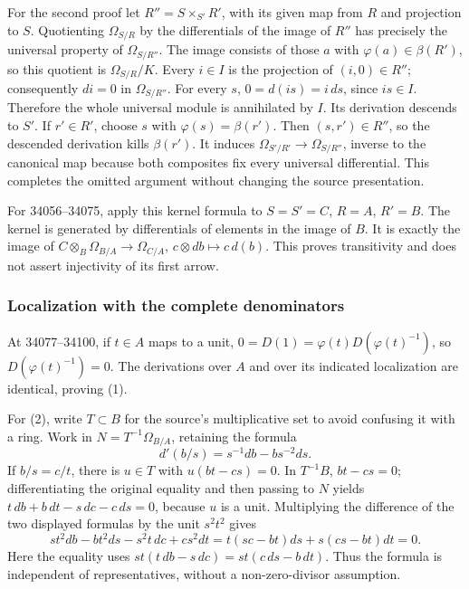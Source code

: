 For the second proof let \(R''=S\times_{S'}R'\), with its given map from \(R\) and projection to \(S\). Quotienting \(\Omega_{S/R}\) by the differentials of the image of \(R''\) has precisely the universal property of \(\Omega_{S/R''}\). The image consists of those \(a\) with \(\varphi(a)\in\beta(R')\), so this quotient is \(\Omega_{S/R}/K\). Every \(i\in I\) is the projection of \((i,0)\in R''\); consequently \(di=0\) in \(\Omega_{S/R''}\). For every \(s\), \(0=d(is)=i\,ds\), since \(is\in I\). Therefore the whole universal module is annihilated by \(I\). Its derivation descends to \(S'\). If \(r'\in R'\), choose \(s\) with \(\varphi(s)=\beta(r')\). Then \((s,r')\in R''\), so the descended derivation kills \(\beta(r')\). It induces \(\Omega_{S'/R'}\to\Omega_{S/R''}\), inverse to the canonical map because both composites fix every universal differential. This completes the omitted argument without changing the source presentation.

For 34056--34075, apply this kernel formula to \(S=S'=C\), \(R=A\), \(R'=B\). The kernel is generated by differentials of elements in the image of \(B\). It is exactly the image of \(C\otimes_B\Omega_{B/A}\to\Omega_{C/A}\), \(c\otimes db\mapsto c\,d(b)\). This proves transitivity and does not assert injectivity of its first arrow.

\subsubsection{Localization with the complete denominators}\label{localization-with-the-complete-denominators}

At 34077--34100, if \(t\in A\) maps to a unit, \(0=D(1)=\varphi(t)D(\varphi(t)^{-1})\), so \(D(\varphi(t)^{-1})=0\). The derivations over \(A\) and over its indicated localization are identical, proving (1).

For (2), write \(T\subset B\) for the source's multiplicative set to avoid confusing it with a ring. Work in \(N=T^{-1}\Omega_{B/A}\), retaining the formula \[
d'(b/s)=s^{-1}db-bs^{-2}ds.
\] If \(b/s=c/t\), there is \(u\in T\) with \(u(bt-cs)=0\). In \(T^{-1}B\), \(bt-cs=0\); differentiating the original equality and then passing to \(N\) yields \(t\,db+b\,dt-s\,dc-c\,ds=0\), because \(u\) is a unit. Multiplying the difference of the two displayed formulas by the unit \(s^2t^2\) gives \[
st^2db-bt^2ds-s^2t\,dc+cs^2dt
=t(sc-bt)ds+s(cs-bt)dt=0.
\] Here the equality uses \(st(t\,db-s\,dc)=st(c\,ds-b\,dt)\). Thus the formula is independent of representatives, without a non-zero-divisor assumption.

